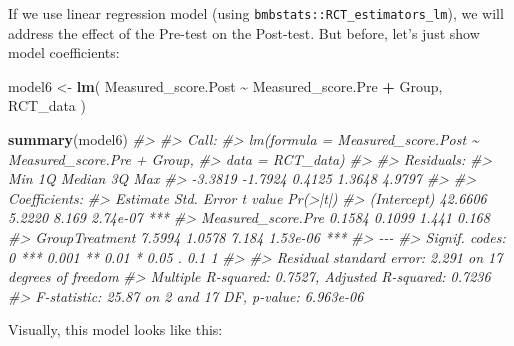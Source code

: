 \documentclass[
]{book}
\newenvironment{Shaded}{\begin{snugshade}}{\end{snugshade}}
\newcommand{\CommentTok}[1]{\textcolor[rgb]{0.56,0.35,0.01}{\textit{#1}}}
\newcommand{\KeywordTok}[1]{\textcolor[rgb]{0.13,0.29,0.53}{\textbf{#1}}}
\newcommand{\NormalTok}[1]{#1}
\newcommand{\OperatorTok}[1]{\textcolor[rgb]{0.81,0.36,0.00}{\textbf{#1}}}
\newcommand{\StringTok}[1]{\textcolor[rgb]{0.31,0.60,0.02}{#1}}
\begin{document}
If we use linear regression model (using \texttt{bmbstats::RCT\_estimators\_lm}), we will address the effect of the Pre-test on the Post-test. But before, let's just show model coefficients:

\begin{Shaded}
\begin{Highlighting}[]
\NormalTok{model6 <{-}}\StringTok{ }\KeywordTok{lm}\NormalTok{(}
\NormalTok{  Measured\_score.Post }\OperatorTok{\textasciitilde{}}\StringTok{ }\NormalTok{Measured\_score.Pre }\OperatorTok{+}\StringTok{ }\NormalTok{Group,}
\NormalTok{  RCT\_data}
\NormalTok{)}

\KeywordTok{summary}\NormalTok{(model6)}
\CommentTok{\#> }
\CommentTok{\#> Call:}
\CommentTok{\#> lm(formula = Measured\_score.Post \textasciitilde{} Measured\_score.Pre + Group, }
\CommentTok{\#>     data = RCT\_data)}
\CommentTok{\#> }
\CommentTok{\#> Residuals:}
\CommentTok{\#>     Min      1Q  Median      3Q     Max }
\CommentTok{\#> {-}3.3819 {-}1.7924  0.4125  1.3648  4.9797 }
\CommentTok{\#> }
\CommentTok{\#> Coefficients:}
\CommentTok{\#>                    Estimate Std. Error t value Pr(>|t|)    }
\CommentTok{\#> (Intercept)         42.6606     5.2220   8.169 2.74e{-}07 ***}
\CommentTok{\#> Measured\_score.Pre   0.1584     0.1099   1.441    0.168    }
\CommentTok{\#> GroupTreatment       7.5994     1.0578   7.184 1.53e{-}06 ***}
\CommentTok{\#> {-}{-}{-}}
\CommentTok{\#> Signif. codes:  0 \textquotesingle{}***\textquotesingle{} 0.001 \textquotesingle{}**\textquotesingle{} 0.01 \textquotesingle{}*\textquotesingle{} 0.05 \textquotesingle{}.\textquotesingle{} 0.1 \textquotesingle{} \textquotesingle{} 1}
\CommentTok{\#> }
\CommentTok{\#> Residual standard error: 2.291 on 17 degrees of freedom}
\CommentTok{\#> Multiple R{-}squared:  0.7527,	Adjusted R{-}squared:  0.7236 }
\CommentTok{\#> F{-}statistic: 25.87 on 2 and 17 DF,  p{-}value: 6.963e{-}06}
\end{Highlighting}
\end{Shaded}

Visually, this model looks like this:
\end{document}
